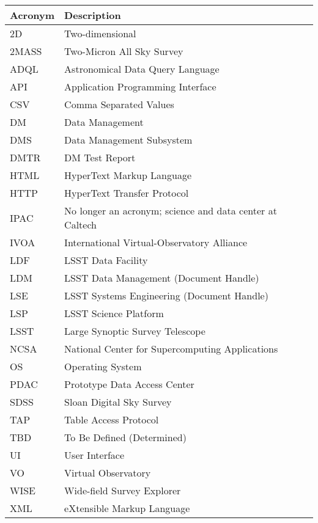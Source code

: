 \addtocounter{table}{-1}
\begin{longtable}{p{}p{}}\hline
\textbf{Acronym} & \textbf{Description}  \\\hline

2D & Two-dimensional \\\hline
2MASS & Two-Micron All Sky Survey \\\hline
ADQL & Astronomical Data Query Language \\\hline
API & Application Programming Interface \\\hline
CSV & Comma Separated Values \\\hline
DM & Data Management \\\hline
DMS & Data Management Subsystem \\\hline
DMTR & DM Test Report \\\hline
HTML & HyperText Markup Language \\\hline
HTTP & HyperText Transfer Protocol \\\hline
IPAC & No longer an acronym; science and data center at Caltech \\\hline
IVOA & International Virtual-Observatory Alliance \\\hline
LDF & LSST Data Facility \\\hline
LDM & LSST Data Management (Document Handle) \\\hline
LSE & LSST Systems Engineering (Document Handle) \\\hline
LSP & LSST Science Platform \\\hline
LSST & Large Synoptic Survey Telescope \\\hline
NCSA & National Center for Supercomputing Applications \\\hline
OS & Operating System \\\hline
PDAC & Prototype Data Access Center \\\hline
SDSS & Sloan Digital Sky Survey \\\hline
TAP & Table Access Protocol \\\hline
TBD & To Be Defined (Determined) \\\hline
UI & User Interface \\\hline
VO & Virtual Observatory \\\hline
WISE & Wide-field Survey Explorer \\\hline
XML & eXtensible Markup Language \\\hline
\end{longtable}
